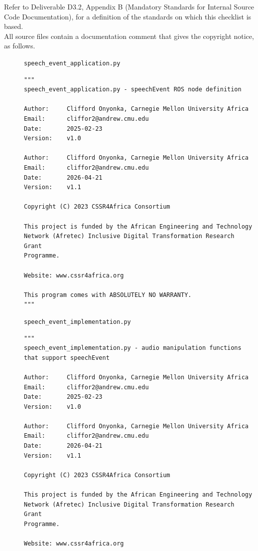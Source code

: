 \documentclass{CSSRforAfrica}
\newcommand{\checkboxChecked}{\fbox{\ding{51}}} %
\begin{document}
Refer to Deliverable D3.2, Appendix B (Mandatory Standards for Internal Source Code Documentation), for a definition of the standards on which this checklist is based.\\

\noindent All source files contain a documentation comment that gives the copyright notice, as follows.
 
\begin{description}

\item[\checkboxChecked] {\small \verb+speech_event_application.py+}  
{\small \begin{verbatim}
"""
speech_event_application.py - speechEvent ROS node definition

Author:     Clifford Onyonka, Carnegie Mellon University Africa
Email:      cliffor2@andrew.cmu.edu
Date:       2025-02-23
Version:    v1.0

Author:     Clifford Onyonka, Carnegie Mellon University Africa
Email:      cliffor2@andrew.cmu.edu
Date:       2026-04-21
Version:    v1.1

Copyright (C) 2023 CSSR4Africa Consortium

This project is funded by the African Engineering and Technology
Network (Afretec) Inclusive Digital Transformation Research Grant
Programme.

Website: www.cssr4africa.org

This program comes with ABSOLUTELY NO WARRANTY.
"""
\end{verbatim} }

\item[\checkboxChecked]  {\small \verb+speech_event_implementation.py+} 
{\small \begin{verbatim}
"""
speech_event_implementation.py - audio manipulation functions that support speechEvent

Author:     Clifford Onyonka, Carnegie Mellon University Africa
Email:      cliffor2@andrew.cmu.edu
Date:       2025-02-23
Version:    v1.0

Author:     Clifford Onyonka, Carnegie Mellon University Africa
Email:      cliffor2@andrew.cmu.edu
Date:       2026-04-21
Version:    v1.1

Copyright (C) 2023 CSSR4Africa Consortium

This project is funded by the African Engineering and Technology
Network (Afretec) Inclusive Digital Transformation Research Grant
Programme.

Website: www.cssr4africa.org


\end{verbatim}}
\end{description}
\end{document}
